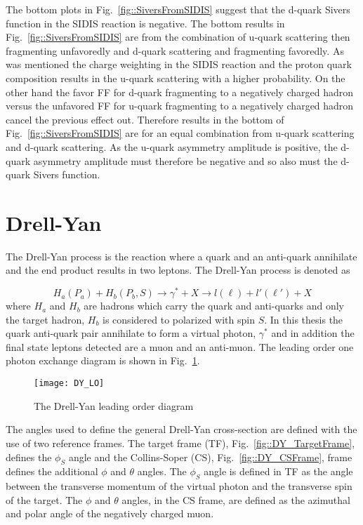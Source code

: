 The bottom plots in Fig.~\ref{fig::SiversFromSIDIS} suggest that the d-quark
Sivers function in the SIDIS reaction is negative.  The bottom results in
Fig.~\ref{fig::SiversFromSIDIS} are from the combination of u-quark scattering
then fragmenting unfavoredly and d-quark scattering and fragmenting favoredly.
As was mentioned the charge weighting in the SIDIS reaction and the proton quark
composition results in the u-quark scattering with a higher probability.  On the
other hand the favor FF for d-quark fragmenting to a negatively charged hadron
versus the unfavored FF for u-quark fragmenting to a negatively charged hadron
cancel the previous effect out.  Therefore results in the bottom of
Fig.~\ref{fig::SiversFromSIDIS} are for an equal combination from u-quark
scattering and d-quark scattering.  As the u-quark asymmetry amplitude is
positive, the d-quark asymmetry amplitude must therefore be negative and so also
must the d-quark Sivers function.


\section{Drell-Yan} \label{sec::DY}
The Drell-Yan process is the reaction where a quark and an anti-quark annihilate
and the end product results in two leptons.  The Drell-Yan process is denoted as

\begin{equation}
  H_a(P_a) + H_b(P_b, S) \rightarrow \gamma^* + X \rightarrow l(\ell) +
  l'(\ell') + X
\end{equation}
\noindent
where $H_a$ and $H_b$ are hadrons which carry the quark and anti-quarks and only
the target hadron, $H_b$ is considered to polarized with spin $S$.  In this
thesis the quark anti-quark pair annihilate to form a virtual photon, $\gamma^*$
and in addition the final state leptons detected are a muon and an anti-muon.
The leading order one photon exchange diagram is shown in Fig.~\ref{fig::DY_LO}.

\begin{figure}[h!t]
  \centering
  \texttt{[image: DY\_LO]}
  \caption{The Drell-Yan leading order diagram}
  \label{fig::DY_LO}
\end{figure}

The angles used to define the general Drell-Yan cross-section are defined with
the use of two reference frames.  The target frame (TF),
Fig.~\ref{fig::DY_TargetFrame}, defines the $\phi_S$ angle and the Collins-Soper
(CS), Fig.~\ref{fig::DY_CSFrame}, frame defines the additional $\phi$ and
$\theta$ angles.  The $\phi_S$ angle is defined in TF as the angle between the
transverse momentum of the virtual photon and the transverse spin of the target.
The $\phi$ and $\theta$ angles, in the CS frame, are defined as the azimuthal
and polar angle of the negatively charged muon.

